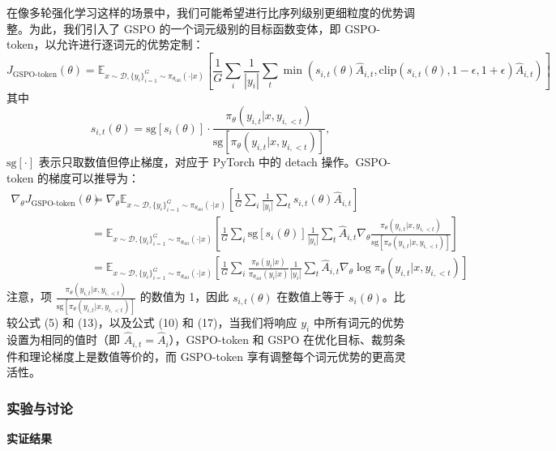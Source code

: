 在像多轮强化学习这样的场景中，我们可能希望进行比序列级别更细粒度的优势调整。为此，我们引入了 GSPO 的一个词元级别的目标函数变体，即 GSPO-token，以允许进行逐词元的优势定制：
\begin{equation}
J_{\text{GSPO-token}}(\theta) = \mathbb{E}_{x \sim \mathcal{D}, \{y_i\}_{i=1}^G \sim \pi_{\theta_{\text{old}}}(\cdot|x)} \left[ \frac{1}{G} \sum_i \frac{1}{|y_i|} \sum_t \min \left( s_{i,t}(\theta) \hat{A}_{i,t}, \text{clip}(s_{i,t}(\theta), 1-\epsilon, 1+\epsilon) \hat{A}_{i,t} \right) \right]
\end{equation}
其中
\begin{equation}
s_{i,t}(\theta) = \text{sg}[s_i(\theta)] \cdot \frac{\pi_\theta(y_{i,t}|x, y_{i,<t})}{\text{sg}[\pi_\theta(y_{i,t}|x, y_{i,<t})]},
\end{equation}
$\text{sg}[\cdot]$ 表示只取数值但停止梯度，对应于 PyTorch 中的 detach 操作。GSPO-token 的梯度可以推导为：
\begin{align}
\nabla_\theta J_{\text{GSPO-token}}(\theta) &= \nabla_\theta \mathbb{E}_{x \sim \mathcal{D}, \{y_i\}_{i=1}^G \sim \pi_{\theta_{\text{old}}}(\cdot|x)} \left[ \frac{1}{G} \sum_i \frac{1}{|y_i|} \sum_t s_{i,t}(\theta) \hat{A}_{i,t} \right] \\
 &= \mathbb{E}_{x \sim \mathcal{D}, \{y_i\}_{i=1}^G \sim \pi_{\theta_{\text{old}}}(\cdot|x)} \left[ \frac{1}{G} \sum_i \text{sg}[s_i(\theta)] \frac{1}{|y_i|} \sum_t \hat{A}_{i,t} \nabla_\theta \frac{\pi_\theta(y_{i,t}|x, y_{i,<t})}{\text{sg}[\pi_\theta(y_{i,t}|x, y_{i,<t})]} \right] \\
 &= \mathbb{E}_{x \sim \mathcal{D}, \{y_i\}_{i=1}^G \sim \pi_{\theta_{\text{old}}}(\cdot|x)} \left[ \frac{1}{G} \sum_i \frac{\pi_\theta(y_i|x)}{\pi_{\theta_{\text{old}}}(y_i|x)} \frac{1}{|y_i|} \sum_t \hat{A}_{i,t} \nabla_\theta \log \pi_\theta(y_{i,t}|x, y_{i,<t}) \right]
\end{align}
注意，项 $\frac{\pi_\theta(y_{i,t}|x, y_{i,<t})}{\text{sg}[\pi_\theta(y_{i,t}|x, y_{i,<t})]}$ 的数值为 1，因此 $s_{i,t}(\theta)$ 在数值上等于 $s_i(\theta)$。比较公式 (5) 和 (13)，以及公式 (10) 和 (17)，当我们将响应 $y_i$ 中所有词元的优势设置为相同的值时（即 $\hat{A}_{i,t} = \hat{A}_i$），GSPO-token 和 GSPO 在优化目标、裁剪条件和理论梯度上是数值等价的，而 GSPO-token 享有调整每个词元优势的更高灵活性。

\subsubsection{实验与讨论}

\textbf{实证结果}

